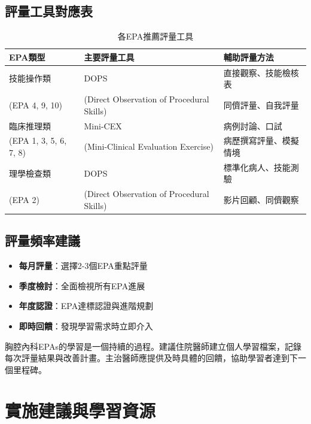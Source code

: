\documentclass[12pt,a4paper]{article}
\newcommand{\note}[1]{
    \par
    \noindent
    \begin{tcolorbox}[
        colback=emergency_blue!5!white,
        colframe=emergency_blue,
        title=\textbf{重點提醒},
        fonttitle=\bfseries,
        boxrule=0.5pt,
        arc=3pt,
        left=6pt,
        right=6pt,
        top=6pt,
        bottom=6pt
    ]
    #1
    \end{tcolorbox}
}
\begin{document}
\subsection{評量工具對應表}
\begin{table}[h]
    \centering
    \caption{各EPA推薦評量工具}
    \begin{tabular}{p{4cm} p{4cm} p{6cm}}
        \toprule
        \textbf{EPA類型} & \textbf{主要評量工具} & \textbf{輔助評量方法} \\
        \midrule
        技能操作類 & DOPS & 直接觀察、技能檢核表 \\
        (EPA 4, 9, 10) & (Direct Observation of Procedural Skills) & 同儕評量、自我評量 \\
        \midrule
        臨床推理類 & Mini-CEX & 病例討論、口試 \\
        (EPA 1, 3, 5, 6, 7, 8) & (Mini-Clinical Evaluation Exercise) & 病歷撰寫評量、模擬情境 \\
        \midrule
        理學檢查類 & DOPS & 標準化病人、技能測驗 \\
        (EPA 2) & (Direct Observation of Procedural Skills) & 影片回顧、同儕觀察 \\
        \bottomrule
    \end{tabular}
\end{table}

\subsection{評量頻率建議}
\begin{itemize}[nosep]
    \item \textbf{每月評量}：選擇2-3個EPA重點評量
    \item \textbf{季度檢討}：全面檢視所有EPA進展
    \item \textbf{年度認證}：EPA達標認證與進階規劃
    \item \textbf{即時回饋}：發現學習需求時立即介入
\end{itemize}

\vspace{0.5cm}
\note{
胸腔內科EPAs的學習是一個持續的過程。建議住院醫師建立個人學習檔案，記錄每次評量結果與改善計畫。主治醫師應提供及時具體的回饋，協助學習者達到下一個里程碑。
}

\section{實施建議與學習資源}
\end{document}
